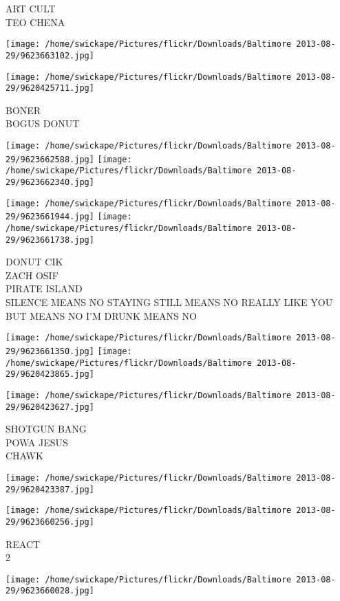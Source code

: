 \documentclass[10pt,letterpaper]{article}
\begin{document}
ART CULT\\
TEO CHENA
\pagebreak

\texttt{[image: /home/swickape/Pictures/flickr/Downloads/Baltimore 2013-08-29/9623663102.jpg]}

\vspace{0.25in}
\texttt{[image: /home/swickape/Pictures/flickr/Downloads/Baltimore 2013-08-29/9620425711.jpg]}

BONER\\
BOGUS DONUT
\pagebreak

\texttt{[image: /home/swickape/Pictures/flickr/Downloads/Baltimore 2013-08-29/9623662588.jpg]}
\texttt{[image: /home/swickape/Pictures/flickr/Downloads/Baltimore 2013-08-29/9623662340.jpg]}

\texttt{[image: /home/swickape/Pictures/flickr/Downloads/Baltimore 2013-08-29/9623661944.jpg]}
\texttt{[image: /home/swickape/Pictures/flickr/Downloads/Baltimore 2013-08-29/9623661738.jpg]}

DONUT CIK\\
ZACH OSIF\\
PIRATE ISLAND\\
SILENCE MEANS NO STAYING STILL MEANS NO REALLY LIKE YOU BUT MEANS NO I'M DRUNK MEANS NO
\pagebreak

\texttt{[image: /home/swickape/Pictures/flickr/Downloads/Baltimore 2013-08-29/9623661350.jpg]}
\texttt{[image: /home/swickape/Pictures/flickr/Downloads/Baltimore 2013-08-29/9620423865.jpg]}

\vspace{0.25in}
\texttt{[image: /home/swickape/Pictures/flickr/Downloads/Baltimore 2013-08-29/9620423627.jpg]}

SHOTGUN BANG\\
POWA JESUS\\
CHAWK
\pagebreak

\texttt{[image: /home/swickape/Pictures/flickr/Downloads/Baltimore 2013-08-29/9620423387.jpg]}

\vspace{0.25in}
\texttt{[image: /home/swickape/Pictures/flickr/Downloads/Baltimore 2013-08-29/9623660256.jpg]}

REACT\\
2
\pagebreak

\texttt{[image: /home/swickape/Pictures/flickr/Downloads/Baltimore 2013-08-29/9623660028.jpg]}
\end{document}
